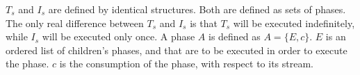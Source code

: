 $T_s$ and $I_s$ are defined by identical structures.  Both are
defined as sets of phases. The only real difference between $T_s$
and $I_s$ is that $T_s$ will be executed indefinitely, while $I_s$
will be executed only once. A phase $A$ is defined as $A = \{E,
c\}$.  $E$ is an ordered list of children's phases, {\splitters}
and {\joiners} that are to be executed in order to execute the
phase. $c$ is the consumption of the phase, with respect to its
stream.

\begin{comment}
As an example, here is a minimal latency schedule for the sample
stream in Figure \ref{fig:sample-sj}.  First, the schedule for the
internal {\splitjoin}:

\begin{displaymath} \small
P_{sj} = \left\{
\begin{array}{c}
T_{sj} = \left\{
\begin{array}{c}
A_{sj,0} = \left\{\{\{6\ split\}\{2C\}\{5D\}\ join\},
\left[\begin{array}{c}12\\12\\12\end{array}\right]\right\}, \\
A_{sj,1} = \left\{\{\{3\ split\}C\{4D\}\ join\},
\left[\begin{array}{c}6\\6\\12\end{array}\right]\right\}
\end{array}\right\}, \\
I_{sj} = \left\{ \right\}, \\
c_{sj} = \left[ \begin{array}{c} 18 \\ 18 \\ 24 \end{array}
\right], c^i_{sj} = \left[ \begin{array}{c} 0 \\ 0 \\ 0
\end{array} \right]
\end{array} \right\}
\end{displaymath}

\noindent And the following is a schedule for the {\pipeline}:


\end{comment}
